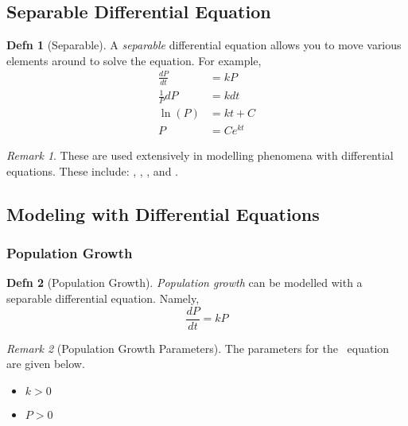 \documentclass[10pt,letterpaper,final,twoside,notitlepage]{article}
\theoremstyle{plain}
\theoremstyle{definition}
\newtheorem{definition}{Defn}
\theoremstyle{remark}
\newtheorem{remark}{Remark}[definition]
\newcounter{example}[section]
\begin{document}
	\subsection{Separable Differential Equation}
		\begin{definition}[Separable]
			A \emph{separable} differential equation allows you to move various elements around to solve the equation.
			For example,
			\begin{align*}
				\frac{dP}{dt} &= kP \\
				\frac{1}{P} dP &= k dt \\
				\ln \left( P \right) &= kt + C \\
				P &= Ce^{kt}
			\end{align*}
			\begin{remark}
				These are used extensively in modelling phenomena with differential equations.
				These include: , , , and .
			\end{remark}
		\end{definition}
		
	\subsection{Modeling with Differential Equations} \label{subsec:Modeling with DEs}
		\subsubsection{Population Growth} \label{subsubsec:Population Growth}
			\begin{definition}[Population Growth]
				\emph{Population growth} can be modelled with a separable differential equation. Namely,
				\begin{equation} \label{eq:Population Growth}
					\frac{dP}{dt} = kP
				\end{equation}
				\begin{remark}[Population Growth Parameters] \label{rmk:Population Growth Parameters}
					The parameters for the ~equation are given below.
					\begin{itemize}[noitemsep, nolistsep]
						\item $k>0$
						\item $P>0$
					\end{itemize}
				\end{remark}
			\end{definition}
\end{document}
